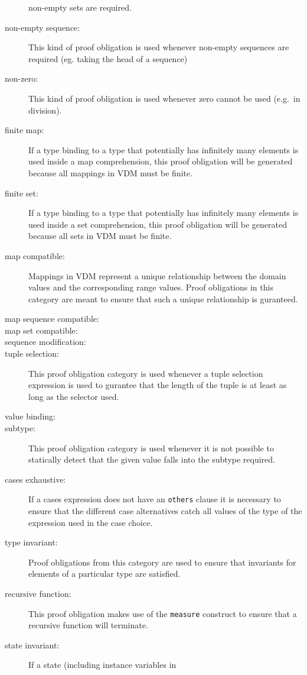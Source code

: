 \documentclass{overturerepchap}
\begin{document}
\begin{description}
  non-empty sets are required.
\item[non-empty sequence:] This kind of proof obligation is used whenever
  non-empty sequences are required (eg. taking the head of a sequence)
\item[non-zero:] This kind of proof obligation is used whenever zero
  cannot be used (e.g.\ in division).
\item[finite map:] If a type binding to a type that potentially has
  infinitely many elements is used inside a map comprehension, this
  proof obligation will be generated because all mappings in VDM must be finite.
\item[finite set:] If a type binding to a type that potentially has
  infinitely many elements is used inside a set comprehension, this
  proof obligation will be generated because all sets in VDM must be finite.
\item[map compatible:] Mappings in VDM represent a unique relationship
  between the domain values and the corresponding range values. Proof
  obligations in this category are meant to ensure that such a unique
  relationship is guranteed.
\item[map sequence compatible:]
\item[map set compatible:]
\item[sequence modification:]
\item[tuple selection:] This proof obligation category is used
  whenever a tuple selection expression is used to
  gurantee that the length of the tuple is at least as long as the
  selector used.
\item[value binding:]
\item[subtype:] This proof obligation category is used whenever it is
  not possible to statically detect that the given value
  falls into the subtype required.
\item[cases exhaustive:] If a cases expression does not have an
  \texttt{others} clause it is necessary to ensure that the
  different case alternatives catch all values of the type of the
  expression used in the case choice.
\item[type invariant:] Proof obligations from this category are used
  to ensure that invariants for elements of a particular type are satisfied.
\item[recursive function:] This proof obligation makes use of the
  \texttt{measure} construct to ensure that a recursive function
  will terminate.
\item[state invariant:] If a state (including instance variables in

\end{description}
\end{document}
